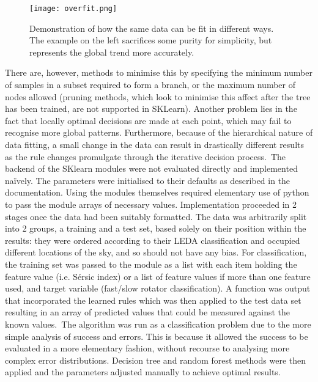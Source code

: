 \begin{figure}[h]
	\caption{Demonstration of how the same data can be fit in different ways. The example on the left sacrifices some purity for simplicity, but represents the global trend more accurately\cite{ofit}.}
	\centering
	\texttt{[image: overfit.png]}
	\label{fig:overfit}
\end{figure}
There are, however, methods to minimise this by specifying the minimum number of samples in a subset required to form a branch, or the maximum number of nodes allowed (pruning methods, which look to minimise this affect after the tree has been trained, are not supported in SKLearn). Another problem lies in the fact that locally optimal decisions are made at each point, which may fail to recognise more global patterns. Furthermore, because of the hierarchical nature of data fitting, a small change in the data can result in drastically different results as the rule changes promulgate through the iterative decision process.\
The backend of the SKlearn modules were not evaluated directly and implemented na\"{i}vely. The parameters were initialised to their defaults as described in the documentation\cite{sklearn}. Using the modules themselves required elementary use of python to pass the module arrays of necessary values. Implementation proceeded in 2 stages once the data had been suitably formatted. The data was arbitrarily split into 2 groups, a training and a test set, based solely on their position within the results: they were ordered according to their LEDA classification and occupied different locations of the sky, and so should not have any bias. For classification, the training set was passed to the module as a list with each item holding the feature value (i.e. S\'{e}rsic index) or a list of feature values if more than one feature used, and target variable (fast/slow rotator classification). A function was output that incorporated the learned rules which was then applied to the test data set resulting in an array of predicted values that could be measured against the known values.\
The algorithm was run as a classification problem due to the more simple analysis of success and errors. This is because it allowed the success to be evaluated in a more elementary fashion, without recourse to analysing more complex error distributions.
Decision tree and random forest methods were then applied and the parameters adjusted manually to achieve optimal results.
